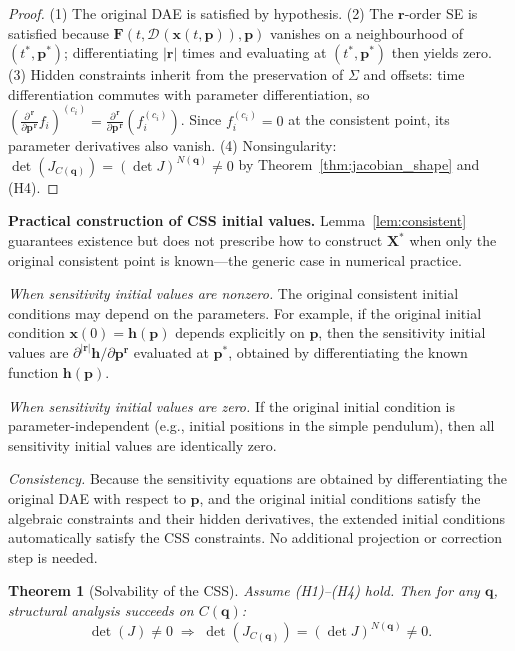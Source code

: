 \documentclass[12pt,a4paper]{article}
\theoremstyle{definition}
\theoremstyle{plain}
\newtheorem{theorem}{Theorem}[section]
\theoremstyle{remark}
\newcommand{\vx}{\mathbf{x}}
\newcommand{\vp}{\mathbf{p}}
\newcommand{\vq}{\mathbf{q}}
\newcommand{\vr}{\mathbf{r}}
\newcommand{\vF}{\mathbf{F}}
\newcommand{\vh}{\mathbf{h}}
\newcommand{\vX}{\mathbf{X}}
\newcommand{\D}[2]{\frac{\partial^{\,#2}}{\partial #1^{\,#2}}}
\newcommand{\derof}[2]{\mathcal{D}_{#1}\!\left(#2\right)\!}
\begin{document}
\begin{proof}
(1) The original DAE is satisfied by hypothesis. (2) The $\vr$-order SE is satisfied because $\vF(t,\derof{}{\vx(t,\vp)},\vp)$ vanishes on a neighbourhood of $(t^*,\vp^*)$; differentiating $|\vr|$ times and evaluating at $(t^*,\vp^*)$ then yields zero. (3) Hidden constraints inherit from the preservation of $\Sigma$ and offsets: time differentiation commutes with parameter differentiation, so $(\D{\vp}{\vr}f_i)^{(c_i)} = \D{\vp}{\vr}(f_i^{(c_i)})$. Since $f_i^{(c_i)}=0$ at the consistent point, its parameter derivatives also vanish. (4) Nonsingularity: $\det(J_{C(\vq)}) = (\det J)^{N(\vq)} \neq 0$ by Theorem~\ref{thm:jacobian_shape} and (H4).
\end{proof}

\smallskip\noindent
\textbf{Practical construction of CSS initial values.}
Lemma~\ref{lem:consistent} guarantees existence but does not prescribe how to construct $\vX^*$ when only the original consistent point is known---the generic case in numerical practice.

\textit{When sensitivity initial values are nonzero.} The original consistent initial conditions may depend on the parameters. For example, if the original initial condition $\vx(0) = \vh(\vp)$ depends explicitly on $\vp$, then the sensitivity initial values are $\partial^{|\vr|}\vh/\partial\vp^\vr$ evaluated at $\vp^*$, obtained by differentiating the known function $\vh(\vp)$.

\textit{When sensitivity initial values are zero.} If the original initial condition is parameter-independent (e.g., initial positions in the simple pendulum), then all sensitivity initial values are identically zero.

\textit{Consistency.} Because the sensitivity equations are obtained by differentiating the original DAE with respect to $\vp$, and the original initial conditions satisfy the algebraic constraints and their hidden derivatives, the extended initial conditions automatically satisfy the CSS constraints. No additional projection or correction step is needed.

\begin{theorem}[Solvability of the CSS]
\label{thm:css_solvable}
Assume (H1)--(H4) hold. Then for any $\vq$, structural analysis succeeds on $C(\vq)$:
\[
  \det(J) \neq 0 \;\Longrightarrow\; \det(J_{C(\vq)}) = (\det J)^{N(\vq)} \neq 0.
\]
\end{theorem}
\end{document}
